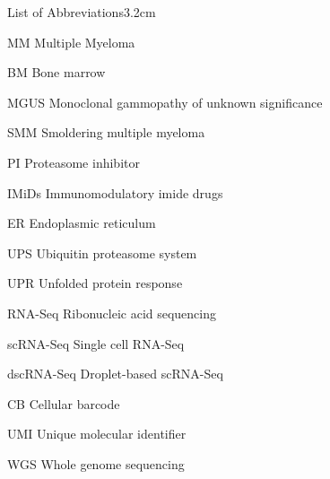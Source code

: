 \begin{mclistof}{List of Abbreviations}{3.2cm}

\item[MM] Multiple Myeloma

\item[BM] Bone marrow

\item[MGUS] Monoclonal gammopathy of unknown significance

\item[SMM] Smoldering multiple myeloma

\item[PI] Proteasome inhibitor

\item[IMiDs] Immunomodulatory imide drugs

\item[ER] Endoplasmic reticulum

\item[UPS] Ubiquitin proteasome system

\item[UPR] Unfolded protein response

\item[RNA-Seq] Ribonucleic acid sequencing

\item[scRNA-Seq] Single cell RNA-Seq

\item[dscRNA-Seq] Droplet-based scRNA-Seq

\item[CB] Cellular barcode

\item[UMI] Unique molecular identifier

\item[WGS] Whole genome sequencing


\end{mclistof} 
